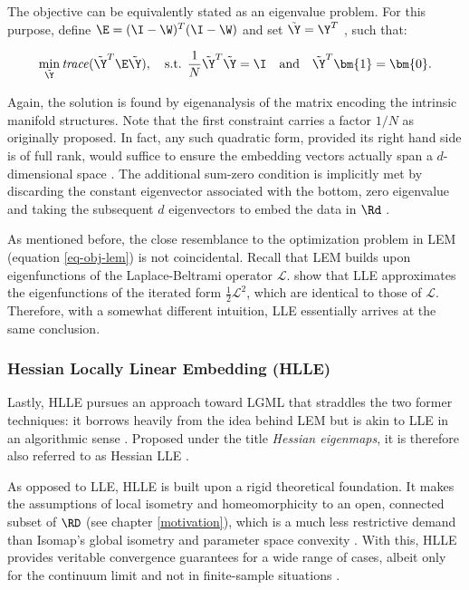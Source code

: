 The objective can be equivalently stated as an eigenvalue problem.
For this purpose, define $\E = (\I - \W)^T(\I - \W)$ and set 
$\tilde{\Y} = \Y^T$ \citep{cayton2005}, such that:

\begin{equation}
  \min_{\tilde{\Y}} \text{\textit{trace}}(\tilde{\Y}^T \E \tilde{\Y}), \quad
  \text{s.t. } \frac{1}{N} \tilde{\Y}^T \tilde{\Y} = \I \quad \text{and}
  \quad \tilde{\Y}^T\bm{1} = \bm{0}.
  \label{eq-obj-lle-emb-2}
\end{equation}

Again, the solution is found by eigenanalysis of the matrix encoding the 
intrinsic manifold structures.
Note that the first constraint carries a factor $1/N$ as originally 
proposed.
In fact, any such quadratic form, provided its right hand side is of full rank, 
would suffice to ensure the embedding vectors actually span a $d$-dimensional 
space \citep{burges2010}.
The additional sum-zero condition is implicitly met by discarding the constant 
eigenvector associated with the bottom, zero eigenvalue and taking the 
subsequent $d$ eigenvectors to embed the data in $\Rd$ \citep{ghojoghetal2020}.

As mentioned before, the close resemblance to the optimization problem in LEM 
(equation \ref{eq-obj-lem}) is not coincidental.
Recall that LEM builds upon eigenfunctions of the Laplace-Beltrami operator 
$\mathcal{L}$.
\citet{belkinniyogi2003} show that LLE approximates the eigenfunctions of the 
iterated form $\frac{1}{2} \mathcal{L}^2$, which are identical to those of 
$\mathcal{L}$.
Therefore, with a somewhat different intuition, LLE essentially arrives at the 
same conclusion.


\subsubsection{Hessian Locally Linear Embedding (HLLE)}
\label{hlle}

Lastly, HLLE \citep{donohogrimes2003} pursues an approach toward LGML that 
straddles the two former techniques: it borrows heavily from the idea behind 
LEM but is akin to LLE in an algorithmic sense \citep{dissross2008}.
Proposed under the title \textit{Hessian eigenmaps}, it is therefore also 
referred to as Hessian LLE \citep{donohogrimes2003}.

As opposed to LLE, HLLE is built upon a rigid theoretical foundation.
It makes the assumptions of local isometry and homeomorphicity to an open, 
connected subset of $\RD$ (see chapter \ref{motivation}), which is a much less 
restrictive demand than Isomap's global isometry and parameter space 
convexity \citep{donohogrimes2003}.
With this, HLLE provides veritable convergence guarantees for a wide range of 
cases, albeit only for the continuum limit and not in finite-sample situations 
\citep{cayton2005}.
\\

